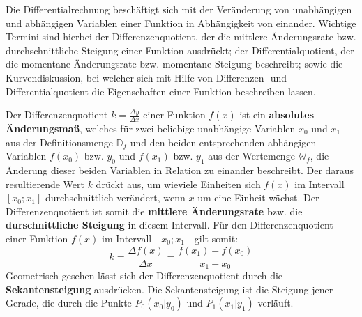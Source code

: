 



\thispagestyle{plain}


Die Differentialrechnung besch\"{a}ftigt sich mit der Ver\"{a}nderung von unabh\"{a}ngigen und abh\"{a}ngigen Variablen einer Funktion in Abh\"{a}ngigkeit von einander. Wichtige Termini sind hierbei der Differenzenquotient, der die mittlere \"{A}nderungsrate bzw. durchschnittliche Steigung einer Funktion ausdr\"{u}ckt; der Differentialquotient, der die momentane \"{A}nderungsrate bzw. 
momentane Steigung beschreibt; sowie die Kurvendiskussion, bei welcher sich mit Hilfe von Differenzen- und Differentialquotient die Eigenschaften einer Funktion beschreiben lassen.


Der Differenzenquotient $k = \frac{\Delta y}{\Delta x}$ einer Funktion $f(x)$ ist ein \textbf{absolutes \"{A}nderungsma\ss{}}, welches f\"{u}r zwei beliebige unabh\"{a}ngige Variablen $x_{0}$ und $x_{1}$ aus der Definitionsmenge $\mathbb{D}_{f}$ und den beiden entsprechenden abh\"{a}ngigen Variablen $f(x_{0})$ bzw. $y_{0}$ und $f(x_{1})$ bzw. $y_{1}$ aus der Wertemenge $\mathbb{W}_{f}$, die \"{A}nderung dieser beiden Variablen in Relation zu einander beschreibt. Der daraus resultierende Wert $k$ dr\"{u}ckt aus, um wieviele Einheiten sich $f(x)$ im Intervall $[x_{0} ; x_{1}]$ durchschnittlich ver\"{a}ndert, wenn $x$ um eine Einheit w\"{a}chst. Der Differenzenquotient ist somit die \textbf{mittlere \"{A}nderungsrate} bzw. die \textbf{durschnittliche Steigung} in diesem Intervall. F\"{u}r den Differenzenquotient einer Funktion $f(x)$ im Intervall $[x_{0} ; x_{1}]$ gilt somit: $$k = \frac{\Delta f(x)}{\Delta x} = \frac{f(x_{1}) - f(x_{0})}{x_{1} - x_{0}}$$ Geometrisch gesehen l\"{a}sst sich der Differenzenquotient durch die \textbf{Sekantensteigung} ausdr\"{u}cken. Die Sekantensteigung ist die Steigung jener Gerade, die durch die Punkte $P_{0}(x_{0}|y_{0})$ und $P_{1}(x_{1}|y_{1})$ verl\"{a}uft.

\vspace{1cm}

